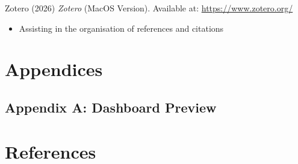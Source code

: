 \documentclass[
  11pt,
  a4paper,
  DIV=11,
  numbers=noendperiod]{scrartcl}
\providecommand{\tightlist}{%
  \setlength{\itemsep}{0pt}\setlength{\parskip}{0pt}}
\begin{document}
Zotero (2026) \emph{Zotero} (MacOS Version). Available at:
\url{https://www.zotero.org/}

\begin{itemize}
\tightlist
\item
  Assisting in the organisation of references and citations
\end{itemize}

\newpage{}

\section*{Appendices}\label{appendices}

\subsection*{Appendix A: Dashboard
Preview}\label{appendix-a-dashboard-preview}

\newpage{}

\section*{References}\label{bibliography}
\end{document}
